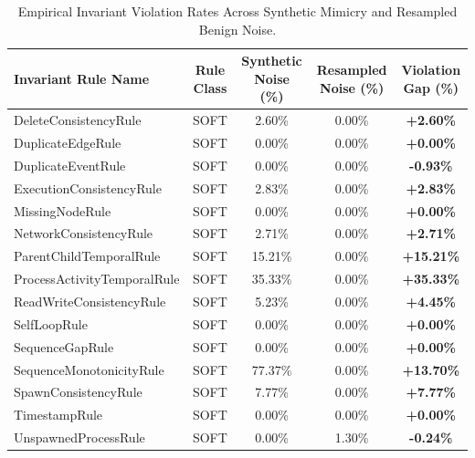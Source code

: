 \begin{table}[t]
\centering
\caption{Empirical Invariant Violation Rates Across Synthetic Mimicry and Resampled Benign Noise.}
\label{tab:noise_realism}
\begin{tabular}{lcccc}
\toprule
\textbf{Invariant Rule Name} & \textbf{Rule Class} & \textbf{Synthetic Noise (\%)} & \textbf{Resampled Noise (\%)} & \textbf{Violation Gap (\%)} \\
\midrule
DeleteConsistencyRule & SOFT & 2.60\% & 0.00\% & \textbf{+2.60\%} \\
DuplicateEdgeRule & SOFT & 0.00\% & 0.00\% & \textbf{+0.00\%} \\
DuplicateEventRule & SOFT & 0.00\% & 0.00\% & \textbf{-0.93\%} \\
ExecutionConsistencyRule & SOFT & 2.83\% & 0.00\% & \textbf{+2.83\%} \\
MissingNodeRule & SOFT & 0.00\% & 0.00\% & \textbf{+0.00\%} \\
NetworkConsistencyRule & SOFT & 2.71\% & 0.00\% & \textbf{+2.71\%} \\
ParentChildTemporalRule & SOFT & 15.21\% & 0.00\% & \textbf{+15.21\%} \\
ProcessActivityTemporalRule & SOFT & 35.33\% & 0.00\% & \textbf{+35.33\%} \\
ReadWriteConsistencyRule & SOFT & 5.23\% & 0.00\% & \textbf{+4.45\%} \\
SelfLoopRule & SOFT & 0.00\% & 0.00\% & \textbf{+0.00\%} \\
SequenceGapRule & SOFT & 0.00\% & 0.00\% & \textbf{+0.00\%} \\
SequenceMonotonicityRule & SOFT & 77.37\% & 0.00\% & \textbf{+13.70\%} \\
SpawnConsistencyRule & SOFT & 7.77\% & 0.00\% & \textbf{+7.77\%} \\
TimestampRule & SOFT & 0.00\% & 0.00\% & \textbf{+0.00\%} \\
UnspawnedProcessRule & SOFT & 0.00\% & 1.30\% & \textbf{-0.24\%} \\
\bottomrule
\end{tabular}
\end{table}
